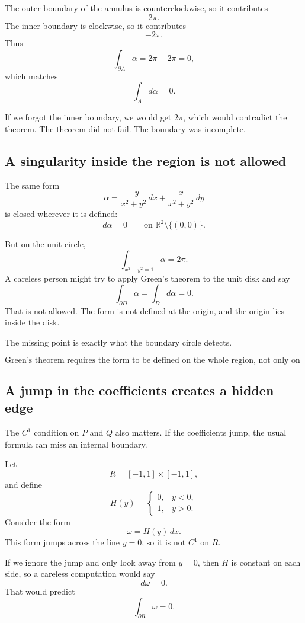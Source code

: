 The outer boundary of the annulus is counterclockwise, so it contributes
\[
    2\pi.
\]
The inner boundary is clockwise, so it contributes
\[
    -2\pi.
\]
Thus
\[
\boxed{
    \int_{\partial A}\alpha=2\pi-2\pi=0,
}
\]
which matches
\[
    \int_A d\alpha=0.
\]

If we forgot the inner boundary, we would get \(2\pi\), which would contradict the
theorem.  The theorem did not fail.  The boundary was incomplete.

\subsection{A singularity inside the region is not allowed}

The same form
\[
    \alpha=
    \frac{-y}{x^2+y^2}\,dx+
    \frac{x}{x^2+y^2}\,dy
\]
is closed wherever it is defined:
\[
    d\alpha=0
    \qquad
    \text{on }\mathbb R^2\setminus\{(0,0)\}.
\]

But on the unit circle,
\[
    \int_{x^2+y^2=1}\alpha=2\pi.
\]
A careless person might try to apply Green's theorem to the unit disk and say
\[
    \int_{\partial D}\alpha
    =
    \int_D d\alpha
    =
    0.
\]
That is not allowed.  The form is not defined at the origin, and the origin lies inside
the disk.

The missing point is exactly what the boundary circle detects.

\[
\boxed{
    \text{Green's theorem requires the form to be defined on the whole region, not only on the boundary.}
}
\]

\subsection{A jump in the coefficients creates a hidden edge}

The \(C^1\) condition on \(P\) and \(Q\) also matters.  If the coefficients jump, the
usual formula can miss an internal boundary.

Let
\[
    R=[-1,1]\times[-1,1],
\]
and define
\[
    H(y)=
    \begin{cases}
    0, & y<0,\\
    1, & y>0.
    \end{cases}
\]
Consider the form
\[
    \omega=H(y)\,dx.
\]
This form jumps across the line \(y=0\), so it is not \(C^1\) on \(R\).

If we ignore the jump and only look away from \(y=0\), then \(H\) is constant on each
side, so a careless computation would say
\[
    d\omega=0.
\]
That would predict
\[
    \int_{\partial R}\omega=0.
\]

